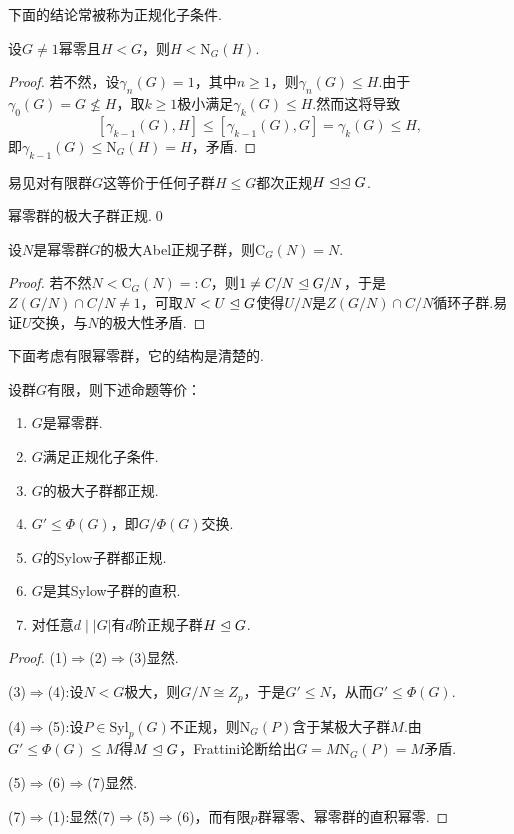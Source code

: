 下面的结论常被称为{\heiti 正规化子条件}.
\begin{prop}
	设$G\ne 1$幂零且$H<G$，则$H<\mathrm{N}_G(H)$.
\end{prop}
\begin{proof}
	若不然，设$\gamma_n(G)=1$，其中$n\ge 1$，则$\gamma_n(G)\le H$.由于$\gamma_0(G)=G\nleq H$，取$k\ge 1$极小满足$\gamma_k(G)\le H$.然而这将导致
	\[
		[\gamma_{k-1}(G),H]\le[\gamma_{k-1}(G),G]=\gamma_k(G)\le H,
	\]
	即$\gamma_{k-1}(G)\le\mathrm{N}_G(H)=H$，矛盾.
\end{proof}
\begin{remark}
	易见对有限群$G$这等价于任何子群$H\le G$都次正规$H\trianglelefteq\trianglelefteq G$.
\end{remark}
\begin{cor*}
	幂零群的极大子群正规.\qed
\end{cor*}
\begin{prop}
	设$N$是幂零群$G$的极大Abel正规子群，则$\mathrm{C}_G(N)=N$.\hypertarget{prop:MaxAbelNormalSubgrpOfNilGrp}{}
\end{prop}
\begin{proof}
	若不然$N<\mathrm{C}_G(N)=:C$，则$1\ne C/N\trianglelefteq G/N$，于是$Z(G/N)\cap C/N\ne 1$，可取$N<U\trianglelefteq G$使得$U/N$是$Z(G/N)\cap C/N$循环子群.易证$U$交换，与$N$的极大性矛盾.
\end{proof}

下面考虑有限幂零群，它的结构是清楚的.
\begin{thm}
	设群$G$有限，则下述命题等价：
	\begin{enumerate}
		\item $G$是幂零群.
		\item $G$满足正规化子条件.
		\item $G$的极大子群都正规.
		\item $G'\le\Phi(G)$，即$G/\Phi(G)$交换\footnotemark .
		\item $G$的Sylow子群都正规.
		\item $G$是其Sylow子群的直积.
		\item 对任意$d\mid|G|$有$d$阶正规子群$H\trianglelefteq G$.
	\end{enumerate}
\end{thm}
\begin{proof}
	\hspace*{5.2pt}(1)$\Rightarrow$(2)$\Rightarrow$(3)显然.

	(3)$\Rightarrow$(4):设$N<G$极大，则$G/N\cong Z_p$，于是$G'\le N$，从而$G'\le\Phi(G)$.

	(4)$\Rightarrow$(5):设$P\in\mathrm{Syl}_p(G)$不正规，则$\mathrm{N}_G(P)$含于某极大子群$M$.由$G'\le\Phi(G)\le M$得$M\trianglelefteq G$，Frattini论断给出$G=M\mathrm{N}_G(P)=M$矛盾.

	(5)$\Rightarrow$(6)$\Rightarrow$(7)显然.

	(7)$\Rightarrow$(1):显然(7)$\Rightarrow$(5)$\Rightarrow$(6)，而有限$p$群幂零、幂零群的直积幂零.
\end{proof}

